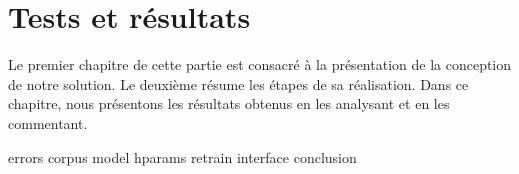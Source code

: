 \chapter{Tests et résultats}%
\label{chap.results}

Le premier chapitre de cette partie est consacré à la présentation de la conception de notre solution.
Le deuxième résume les étapes de sa réalisation.
Dans ce chapitre, nous présentons les résultats obtenus en les analysant et en les commentant.

{errors}
{corpus}
{model}
{hparams}
{retrain}
{interface}
{conclusion}